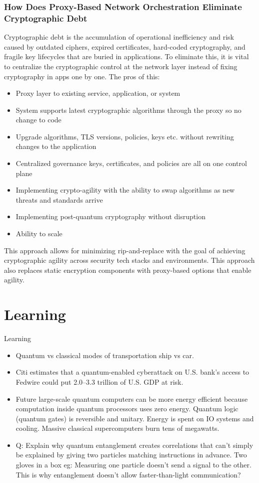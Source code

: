 \documentclass{article}
\begin{document}
\subsubsection{How Does Proxy-Based Network Orchestration Eliminate Cryptographic Debt}
Cryptographic debt is the accumulation of operational inefficiency and risk caused by outdated ciphers, expired certificates, hard-coded cryptography, and fragile key lifecycles that are buried in applications. To eliminate this, it is vital to centralize the cryptographic control at the network layer instead of fixing cryptography in apps one by one. The pros of this: 
\begin{itemize}
    \item Proxy layer to existing service, application, or system
    \item System supports latest cryptographic algorithms through the proxy so no change to code
    \item Upgrade algorithms, TLS versions, policies, keys etc. without rewriting changes to the application
    \item Centralized governance keys, certificates, and policies are all on one control plane
    \item Implementing crypto-agility with the ability to swap algorithms as new threats and standards arrive
\item Implementing post-quantum cryptography without disruption 
\item Ability to scale
\end{itemize}

This approach allows for minimizing rip-and-replace with the goal of achieving cryptographic agility across security tech stacks and environments. This approach also replaces static encryption components with proxy-based options that enable agility. 

\clearpage
\section{Learning}
 {Learning
}
\begin{itemize}
    \item Quantum vs classical modes of transportation ship vs car. 
    \item  Citi estimates that a quantum-enabled cyberattack on U.S. bank's access to Fedwire could put 2.0–3.3 trillion of U.S. GDP at risk.
    \item Future large-scale quantum computers can be more energy efficient because computation inside quantum processors uses zero energy. Quantum logic (quantum gates) is reversible and unitary. Energy is spent on IO systems and cooling. Massive classical supercomputers burn tens of megawatts. 
    \item Q: Explain why quantum entanglement creates correlations that can't simply be explained by giving two particles matching instructions in advance. Two gloves in a box eg: Measuring one particle doesn't send a signal to the other. This is why entanglement doesn't allow faster-than-light communication? 
\end{itemize}
\end{document}
